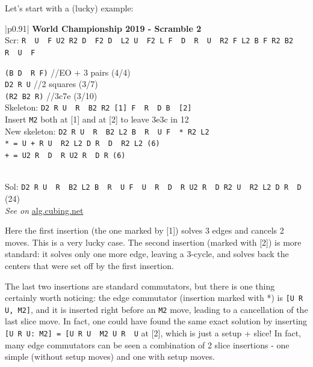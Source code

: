 \documentclass[11pt,a4paper]{book}
\newcommand{\p}{\textquotesingle}
\newcommand{\m}{\texttt}
\newcommand{\ps}{\p\,\,}
\newcommand{\comment}[1]{{\color{gray}\quad//#1}}
\begin{document}
Let's start with a (lucky) example:

\bigskip
\begin{tabular}{|p{}|}
\hline
\textbf{World Championship 2019 - Scramble 2}\\
\hline
Scr: \m{R\ps U\ps F U2 R2 D\ps F2 D\ps L2 U\ps F2 L F\ps D\ps R\ps U\ps R2 F L2 B F R2 B2 R\ps U\ps F}\\
\hline
\begin{minipage}[l]{0.650\textwidth}
\m{(B D\ps R F)} \comment{EO + 3 pairs (4/4)}\\
\m{D2 R U\p} \comment{2 squares (3/7)}\\
\m{(R2 B2 R)} \comment{3c7e (3/10)}\\
Skeleton: \m{D2 R U\ps R\ps B2 R2 [1] F\ps R\ps D B\ps [2]}\\
Insert \m{M2} both at [1] and at [2] to leave 3e3c in 12\\
New skeleton: \m{D2 R U\ps R\ps B2 L2 B\ps R\ps U F\ps * R2 L2}\\
\m{* = U + R U\ps R2 L2 D R\ps D\ps R2 L2 (6)}\\
\m{+ = U2 R\ps D\ps R U2 R\ps D R (6)}\\
\end{minipage}
\begin{minipage}[c]{0.25\textwidth}

\end{minipage}\\
\hline
Sol: \m{D2 R U\ps R\ps B2 L2 B\ps R\ps U F\ps U\ps R\ps D\ps R U2 R\ps D R2 U\ps R2 L2 D R\ps D\p} (24)\\
\hline
\emph{See on }\href{https://alg.cubing.net/?setup=R-_U-_F_U2_R2_D-_F2_D-_L2_U-_F2_L_F-_D-_R-_U-_R2_F_L2_B_F_R2_B2_R-_U-_F&alg=D2_R_U-_R-_B2_L2_B-_R-_U_F-_U-_R-_D-_R_U2_R-_D_R2_U-_R2_L2_D_R-_D-}{alg.cubing.net}\\
\hline
\end{tabular}
\bigskip

Here the first insertion (the one marked by [1]) solves 3 edges and cancels 2 moves. This is a very lucky case. The second insertion (marked with [2]) is more standard: it solves only one more edge, leaving a 3-cycle, and solves back the centers that were set off by the first insertion.

The last two insertions are standard commutators, but there is one thing certainly worth noticing: the edge commutator (insertion marked with *) is \m{[U R U\p, M2]}, and it is inserted right before an \m{M2} move, leading to a cancellation of the last slice move. In fact, one could have found the same exact solution by inserting \m{[U R U\p: M2] = [U R U\ps M2 U R\ps U\p} at [2], which is just a setup + slice! In fact, many edge commutators can be seen a combination of 2 slice insertions - one simple (without setup moves) and one with setup moves.
\end{document}
